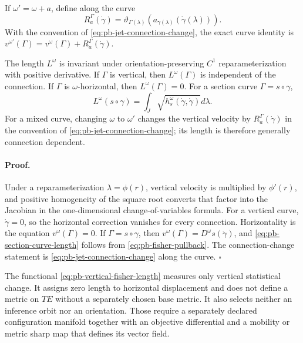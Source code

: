 If $\omega'=\omega+a$, define along the curve
\begin{equation}
R_a^\Gamma(\dot\gamma)
=\vartheta_{\Gamma(\lambda)}
\left(a_{\gamma(\lambda)}(\dot\gamma(\lambda))\right).
\label{eq:pb-curve-connection-change}
\end{equation}
With the convention of \eqref{eq:pb-jet-connection-change}, the exact curve
identity is
$v^{\omega'}(\Gamma)=v^\omega(\Gamma)+R_a^\Gamma(\dot\gamma)$.

The length $L^\omega$ is invariant under orientation-preserving $C^1$
reparameterization with positive derivative.  If $\Gamma$ is vertical, then
$L^\omega(\Gamma)$ is independent of the connection.  If $\Gamma$ is
$\omega$-horizontal, then
$L^\omega(\Gamma)=0$.  For a section curve $\Gamma=s\circ\gamma$,
\begin{equation}
L^\omega(s\circ\gamma)
=\int_J\sqrt{h_s^\omega(\dot\gamma,\dot\gamma)}d\lambda.
\label{eq:pb-section-curve-length}
\end{equation}
For a mixed curve, changing $\omega$ to $\omega'$ changes the vertical
velocity by $R_a^\Gamma(\dot\gamma)$ in the convention of
\eqref{eq:pb-jet-connection-change}; its length is therefore generally
connection dependent.  

\paragraph{Proof.}
Under a reparameterization $\lambda=\phi(r)$, vertical velocity is multiplied
by $\phi'(r)$, and positive homogeneity of the square root converts that
factor into the Jacobian in the one-dimensional change-of-variables formula.
For a vertical curve, $\dot\gamma=0$, so the horizontal correction vanishes
for every connection.  Horizontality is the equation
$v^\omega(\Gamma)=0$.  If $\Gamma=s\circ\gamma$, then
$v^\omega(\Gamma)=D^\omega s(\dot\gamma)$, and
\eqref{eq:pb-section-curve-length} follows from
\eqref{eq:pb-fisher-pullback}.  The connection-change statement is
\eqref{eq:pb-jet-connection-change} along the curve.  $\square$

The functional \eqref{eq:pb-vertical-fisher-length} measures only vertical
statistical change.  It assigns zero length to horizontal displacement and
does not define a metric on $TE$ without a separately chosen base metric.  It
also selects neither an inference orbit nor an orientation.  Those require a
separately declared configuration manifold together with an objective
differential and a mobility or metric sharp map that defines its vector field.

